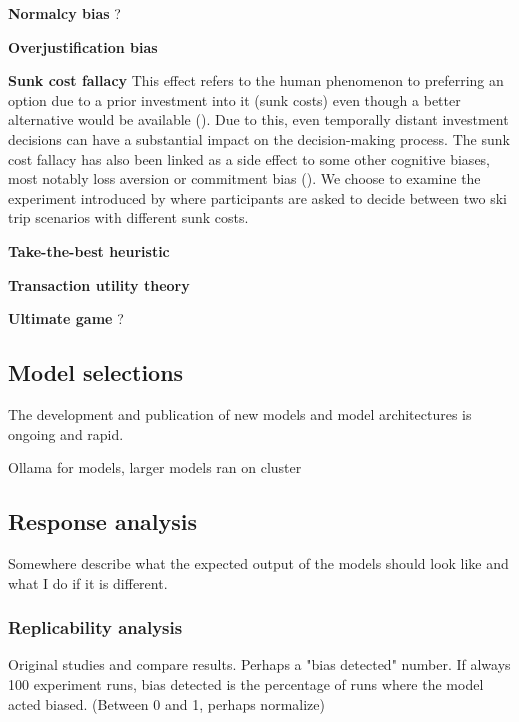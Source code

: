\par \textbf{Normalcy bias} ?

\par \textbf{Overjustification bias} 

\par \textbf{Sunk cost fallacy} This effect refers to the human phenomenon to preferring an option due to a prior investment into it (sunk costs) even though a better alternative would be available (\cite{arkes1985psychology}). Due to this, even temporally distant investment decisions can have a substantial impact on the decision-making process. The sunk cost fallacy has also been linked as a side effect to some other cognitive biases, most notably loss aversion or commitment bias (\cite{jarmolowicz2016sunk}). We choose to examine the experiment introduced by \cite{arkes1985psychology} where participants are asked to decide between two ski trip scenarios with different sunk costs.

\par \textbf{Take-the-best heuristic} 

\par \textbf{Transaction utility theory} 

\par \textbf{Ultimate game} ?


\subsection{Model selections}
\par The development and publication of new models and model architectures is ongoing and rapid. 

Ollama for models, larger models ran on cluster


\subsection{Response analysis}
Somewhere describe what the expected output of the models should look like and what I do if it is different.

\subsubsection{Replicability analysis}
Original studies and compare results. Perhaps a "bias detected" number. If always 100 experiment runs, bias detected is the percentage of runs where the model acted biased. (Between 0 and 1, perhaps normalize)

